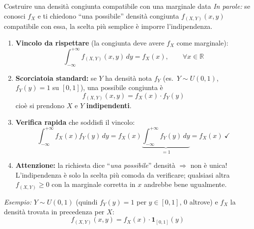 \documentclass[11pt]{article}
\newcommand{\inparole}[1]{\emph{In parole:} #1}
\begin{document}
\begin{concetto}[barGreen]{Costruire una densit\`a congiunta compatibile con una marginale data}
\inparole{se conosci $f_X$ e ti chiedono ``una possibile'' densit\`a congiunta $f_{(X,Y)}(x,y)$ compatibile con essa, la scelta pi\`u semplice \`e imporre l'indipendenza.}
\begin{enumerate}
\item \textbf{Vincolo da rispettare} (la congiunta deve avere $f_X$ come marginale):
\[ \int_{-\infty}^{+\infty} f_{(X,Y)}(x,y)\,dy = f_X(x), \qquad \forall x \in \mathbb{R} \]

\item \textbf{Scorciatoia standard:} se $Y$ ha densit\`a nota $f_Y$ (es.\ $Y\sim U(0,1)$, $f_Y(y)=1$ su $[0,1]$), una possibile congiunta \`e
\[ f_{(X,Y)}(x,y) = f_X(x)\cdot f_Y(y) \]
cio\`e si prendono $X$ e $Y$ \textbf{indipendenti}.

\item \textbf{Verifica rapida} che soddisfi il vincolo:
\[ \int_{-\infty}^{+\infty} f_X(x)f_Y(y)\,dy = f_X(x)\underbrace{\int_{-\infty}^{+\infty} f_Y(y)\,dy}_{=1} = f_X(x) \ \checkmark \]

\item \textbf{Attenzione:} la richiesta dice ``\emph{una possibile}'' densit\`a $\Rightarrow$ non \`e unica! L'indipendenza \`e solo la scelta pi\`u comoda da verificare; qualsiasi altra $f_{(X,Y)}\ge0$ con la marginale corretta in $x$ andrebbe bene ugualmente.
\end{enumerate}

\emph{Esempio:} $Y\sim U(0,1)$ (quindi $f_Y(y)=1$ per $y\in[0,1]$, $0$ altrove) e $f_X$ la densit\`a trovata in precedenza per $X$:
\[ f_{(X,Y)}(x,y) = f_X(x)\cdot \mathbf{1}_{[0,1]}(y) \]
\end{concetto}
\end{document}
